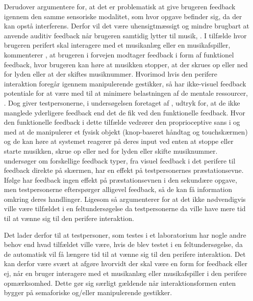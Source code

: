 Derudover argumentere \textcite[s. 3]{PDF:FacilitatingPIDesignAndEvaluation} for, at det er problematisk at give brugeren feedback igennem den samme sensoriske modalitet, som hvor opgave befinder sig, da der kan opstå interferens. Derfor vil det være uhensigtmæssigt og mindre brugbart at anvende auditiv feedback når brugeren samtidig lytter til musik, \parencite[s. 3]{PDF:FacilitatingPIDesignAndEvaluation}. I tilfælde hvor brugeren perifert skal interagere med et musikanlæg eller en musikafspiller, kommenterer \textcite[s. 19]{PDF:PIEmbeddingHCIOnTheRelevance}, at brugeren i forvejen modtager feedback i form af funktionel feedback, hvor brugeren kan høre at musikken stopper, at der skrues op eller ned for lyden eller at der skiftes musiknummer. Hvorimod hvis den perifere interaktion foregår igennem manipulerende gestikker, så har ikke-visuel feedback potentiale for at være med til at minimere belastningen af de mentale ressourcer, \parencite[s. 3]{PDF:FacilitatingPIDesignAndEvaluation}. Dog giver testpersonerne, i undersøgelsen foretaget af \textcite[s. 173]{PDF:ComparingInputModalities}, udtryk for, at de ikke manglede yderligere feedback end det de fik ved den funktionelle feedback. Hvor den funktionelle feedback i dette tilfælde vedrører den proprioceptive sans i og med at de manipulerer et fysisk objekt (knop-baseret håndtag og touchskærmen) og de kan høre at systemet reagerer på deres input ved enten at stoppe eller starte musikken, skrue op eller ned for lyden eller skifte musiknummer. \blankline
%
\textcite[ss. 1263-1268]{PDF:ComparingModFeedback} undersøger om forskellige feedback typer, fra visuel feedback i det perifere til feedback direkte på skærmen, har en effekt på testpersonernes præstationsevne. Ifølge \textcite[ss. 1267-1268]{PDF:ComparingModFeedback} har feedback ingen effekt på præstationsevnen i den sekundære opgave, men testpersonerne efterspørger alligevel feedback, så de kan få information omkring deres handlinger. Ligesom \textcite[s. 174]{PDF:ComparingInputModalities} så argumenterer \textcite[s. 1268]{PDF:ComparingModFeedback} for at det ikke nødvendigvis ville være tilfældet i en feltundersøgelse da testpersonerne da ville have mere tid til at vænne sig til den perifere interaktion. 

Det lader derfor til at testpersoner, som testes i et laboratorium har nogle andre behov end hvad tilfældet ville være, hvis de blev testet i en feltundersøgelse, da de automatisk vil få længere tid til at vænne sig til den perifere interaktion. Det kan derfor være svært at afgøre hvorvidt der skal være en form for feedback eller ej, når en bruger interagere med et musikanlæg eller musikafspiller i den perifere opmærksomhed. Dette gør sig særligt gældende når interaktionsformen enten bygger på semaforiske og/eller manipulerende gestikker.  
%
